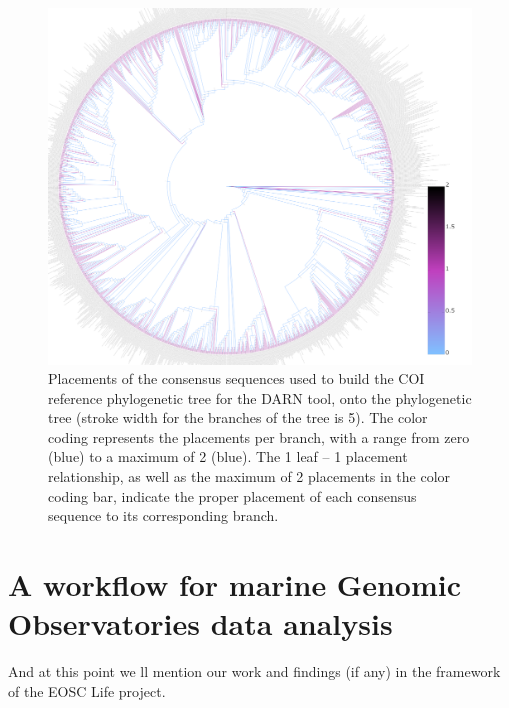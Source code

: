 \begin{figure}{}
   \centering
   \includegraphics{figures/darn_placemnets.png}
   \caption{Placements of the consensus sequences used to build the COI reference phylogenetic tree for the DARN tool, onto the phylogenetic tree (stroke width for the branches of the tree is 5). The color coding represents the placements per branch, with a range from zero (blue) to a maximum of 2 (blue). The 1 leaf – 1 placement relationship, as well as the maximum of 2 placements in the color coding bar, indicate the proper placement of each consensus sequence to its corresponding branch.}
\end{figure}


\section{A workflow for marine Genomic Observatories data analysis}



And at this point we ll mention our work and 
   findings (if any) in the framework of the EOSC Life project.






